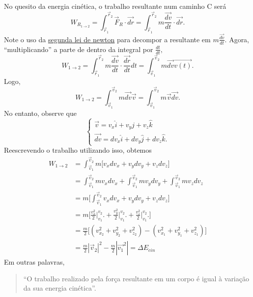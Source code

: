 \documentclass{article}
\begin{document}
  No quesito da energia cinética, o trabalho resultante num caminho C será 
    \[
      W_{R_{1\rightarrow 2}} = \int_{\vec{r}_{1}}^{\vec{r}_{2}}\vec{F}_{R}\cdot \vec{dr} = \int_{\vec{r}_{1}}^{\vec{r}_{2}}m \frac{\vec{dv}}{dt}\cdot \vec{dr}.
    \]
  Note o uso da \hyperlink{second_law}{segunda lei de newton} para decompor a resultante em \(m \frac{\vec{dv}}{dt}.\)
  Agora, ``multiplicando'' a parte de dentro da integral por \(\frac{dt}{dt},\) 
    \[
      W_{1\rightarrow 2} = \int_{\vec{r}_{1}}^{\vec{r}_{2}}m \frac{\vec{dv}}{dt}\cdot \frac{\vec{dr}}{dt}dt = \int_{\vec{v}_{1}}^{\vec{v}_{2}}m \vec{dv}\vec{v(t)}.
    \]
  Logo, 
    \[
      W_{1\rightarrow 2} = \int_{\vec{v}_{1}}^{\vec{v}_{2}}m \vec{dv}\vec{v} = \int_{\vec{v}_{1}}^{\vec{v}_{2}}m \vec{v}\vec{dv}.
    \]
  No entanto, observe que 
    \[
       \left\{\begin{array}{ll}
          \vec{v} = v_{x}\hat{i} + v_{y}\hat{j} + v_{z}\hat{k}\\
          \vec{dv} = dv_{x}\hat{i} + dv_{y}\hat{j} + dv_{z}\hat{k}.
        \end{array}\right.
    \]
  Reescrevendo o trabalho utilizando isso, obtemos 
 \begin{align*}
   W_{1\rightarrow 2} &= \int_{\vec{v}_{1}}^{\vec{v}_{2}}m\biggl[v_{x}dv_{x} + v_{y}dv_{y}+v_{z}dv_{z}\biggr]\\
                      &= \int_{\vec{v}_{1}}^{\vec{v}_{2}}mv_{x}dv_{x} + \int_{\vec{v}_{1}}^{\vec{v}_{2}}mv_{y}dv_{y} + \int_{\vec{v}_{1}}^{\vec{v}_{2}}mv_{z}dv_{z}\\
                      &= m\biggl[\int_{\vec{v}_{1}}^{\vec{v}_{2}}v_{x}dv_{x}+v_{y}dv_{y}+v_{z}dv_{z}\biggr]\\
                      &= m\biggl[\frac{v_{x}^{2}}{2}\biggl|_{v_{1}}^{v_{2}}\biggr. + \frac{v_{y}^{2}}{2}\biggl|_{v_{1}}^{v_{2}}\biggr. + \frac{v_{z}^{2}}{2}\biggl|_{v_{1}}^{v_{2}}\biggr.\biggr]\\
                      &= \frac{m}{2}\biggl[(v_{x_{2}}^{2} + v_{y_{2}}^{2} + v_{z_{2}}^{2}) - (v_{x_{1}}^{2} + v_{y_{1}}^{2} + v_{z_{1}}^{2})\biggr]\\
                      &= \frac{m}{2}|\vec{v}_{2}|^{2} - \frac{m}{2}|\vec{v_{1}}^{2}| = \Delta E_{cin}
 \end{align*}
 Em outras palavras, 
\begin{quote}
  \hypertarget{work_kin_3d}{``O trabalho realizado pela for\c ca resultante em um corpo é igual à varia\c cão da sua energia cinética''.}
\end{quote}
\end{document}
